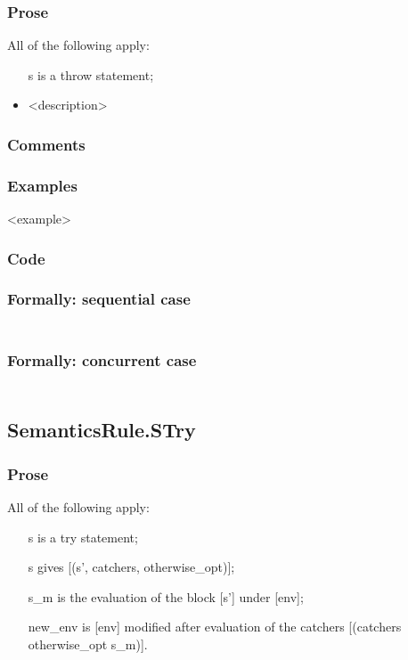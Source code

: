 \documentclass{book}
\begin{document}
    \subsubsection{Prose}
    All of the following apply:
    \begin{itemize}
    \item [s] is a throw statement;
    \item <description>
    \end{itemize}

    \subsubsection{Comments}

    \subsubsection{Examples}
    <example>

  \subsubsection{Code}

  \subsubsection{Formally: sequential case}
  \begin{align}
  \end{align} 

  \subsubsection{Formally: concurrent case}
  \begin{align}
  \end{align} 

\subsection{SemanticsRule.STry \label{sec:SemanticsRule.STry}}

    \subsubsection{Prose}
    All of the following apply:
    \begin{itemize}
    \item [s] is a try statement;
    \item [s] gives [(s', catchers, otherwise\_opt)];
    \item [s\_m] is the evaluation of the block [s'] under [env];
    \item [new\_env] is [env] modified after evaluation of the catchers [(catchers
      otherwise\_opt s\_m)].
    \end{itemize}
\end{document}
